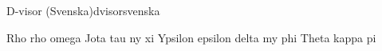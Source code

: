 \begin{song}{D-visor (Svenska)}{dvisorsvenska}
\begin{vers}
Rho rho omega
Jota tau ny xi
Ypsilon epsilon delta my phi
Theta kappa pi
\end{vers}
\end{song}